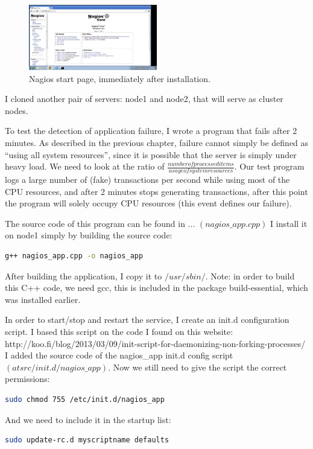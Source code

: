 \documentclass[12pt]{report}
\begin{document}
\begin{figure}[h!]
  \caption{Nagios start page, immediately after installation.}
  \label{fig:nagios_1}
  \centering
    \includegraphics[width=0.5\textwidth]{pics/nagios_1.png}
\end{figure}

I cloned another pair of servers: node1 and node2, that will serve as
cluster nodes.

To test the detection of application failure, I wrote a program that
fails after 2 minutes. As described in the previous chapter, failure
cannot simply be defined as ``using all system resources'', since it
is possible that the server is simply under heavy load. We need to
look at the ratio of $\frac{number of processed items}{usage of system
resources}$. Our test program logs a large number of (fake) transactions per
second while using most of the CPU resources, and after 2 minutes
stops generating transactions, after this point the program will solely occupy CPU
resources (this event defines our failure).

The source code of this program can be found in ... $(nagios\_app.cpp)$
I install it on node1 simply by building the source code:
\begin{lstlisting}[language=bash]
  g++ nagios_app.cpp -o nagios_app 
\end{lstlisting} 
After building the application, I copy it to $/usr/sbin/$.
Note: in order to build this C++ code, we need gcc, this is included
in the package build-essential, which was installed earlier. 

In order to start/stop and restart the service, I create an init.d
configuration script.
I based this script on the code I found on this website: 
http://koo.fi/blog/2013/03/09/init-script-for-daemonizing-non-forking-processes/
I added the source code of the nagios\_app init.d config script $(at src/init.d/nagios\_app)$.
Now we still need to give the script the correct permissions:
\begin{lstlisting}[language=bash]
  sudo chmod 755 /etc/init.d/nagios_app
\end{lstlisting} 
And we need to include it in the startup list:
\begin{lstlisting}[language=bash]
  sudo update-rc.d myscriptname defaults
\end{lstlisting}
\end{document}
